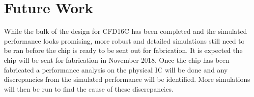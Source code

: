 \documentclass[12pt,oneside,final]{siuethesis}
\theoremstyle{definition}
\begin{document}
\section{Future Work}
\par While the bulk of the design for CFD16C has been completed and the simulated performance looks promising, more robust and detailed simulations still need to be ran before the chip is ready to be sent out for fabrication. It is expected the chip will be sent for fabrication in November 2018. Once the chip has been fabricated a performance analysis on the physical IC will be done and any discrepancies from the simulated performance will be identified. More simulations will then be run to find the cause of these discrepancies. 

\nocite{*}

{} %






\multipleappendices
{}

\setcounter{chapter}{0}
\renewcommand{\theHchapter}{\Alph{chapter}}
\renewcommand{\thechapter}{\Alph{chapter}}
\end{document}
